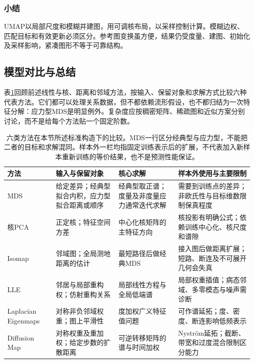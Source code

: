 \subsubsection{小结}

UMAP以局部尺度和模糊并建图，用可调核布局，以采样控制计算。模糊边权、匹配目标和有效更新必须区分。参考图变换虽方便，结果仍受度量、建图、初始化及采样影响，紧凑图形不等于可靠结构。

\subsection{模型对比与总结}
\label{sec:dim-manifold-comparison}
\label{sec:dim-neighbors-comparison}

表\ref{tab:dim-manifold-comparison}回顾前述线性与核、距离和邻域方法，按输入、保留对象和求解方式比较六种代表方法。它们都可以处理关系数据，但不都依赖流形假设，也不都归结为一次特征分解：应力型MDS是明显例外。复杂度应按稠密矩阵、稀疏图和近似方案分别讨论，而不是给每个方法贴一个固定阶数。

\begin{table}[htbp]
  \centering
  \small
  \begin{tabularx}{\linewidth}{@{}>{\RaggedRight\arraybackslash}p{22mm}>{\RaggedRight\arraybackslash}X>{\RaggedRight\arraybackslash}X>{\RaggedRight\arraybackslash}X@{}}
    \toprule
    方法 & 输入与保留对象 & 核心求解 & 样本外使用与主要限制 \\
    \midrule
    MDS & 给定差异；经典型拟合内积，应力型拟合距离或顺序
      & 经典型取正谱；度量及非度量应力通常迭代求解
      & 需要到训练点的差异；非欧氏性与目标维数限制保真程度 \\
    核PCA & 正定核；特征空间方差
      & 中心化核矩阵的主特征方向
      & 核投影有明确公式；依赖训练中心化、核尺度和谱隙 \\
    Isomap & 邻域图；全局测地距离的估计
      & 最短路径后做经典MDS
      & 接入图后做距离扩展；短路、断连及不可展开几何会失真 \\
    LLE & 邻居与局部重构权；仿射重构关系
      & 局部线性方程与全局低端谱
      & 局部权重插值；病态邻域、多零模态与噪声需诊断 \\
    Laplacian Eigenmaps & 对称非负邻域权重；图上平滑性
      & 度加权广义特征值问题
      & 可作谱延拓；度、密度、断连影响低频表示 \\
    Diffusion Map & 对称权重及重加权；给定步数的扩散距离
      & 可逆转移矩阵的谱与时间加权
      & Nystr\"om延拓；截断、带宽和过度混合限制区分能力 \\
    \bottomrule
  \end{tabularx}
  \caption{六类方法在本节所述标准构造下的比较。MDS一行区分经典型与应力型，不能把二者的目标和求解混同。样本外一栏均指固定训练表示后的扩展，不代表加入新样本重新训练的等价结果，也不是预测性能保证。}
  \label{tab:dim-manifold-comparison}
\end{table}

